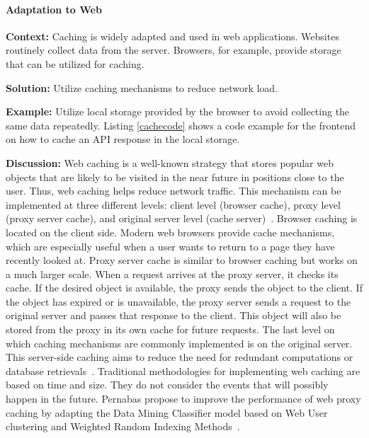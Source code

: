 \paragraph{Adaptation to Web}\mbox{}

\textbf{Context:} Caching is widely adapted and used in web applications. Websites routinely collect data from the server. Browsers, for example, provide storage that can be utilized for caching.

\textbf{Solution:} Utilize caching mechanisms to reduce network load.

\textbf{Example:} Utilize local storage provided by the browser to avoid collecting the same data repeatedly. Listing \ref{cachecode} shows a code example for the frontend on how to cache an API response in the local storage.



\textbf{Discussion:} Web caching is a well-known strategy that stores popular web objects that are likely to be visited in the near future in positions close to the user. Thus, web caching helps reduce network traffic. This mechanism can be implemented at three different levels: client level (browser cache), proxy level (proxy server cache), and original server level (cache server)~\cite{Ali2011}. Browser caching is located on the client side. Modern web browsers provide cache mechanisms, which are especially useful when a user wants to return to a page they have recently looked at. Proxy server cache is similar to browser caching but works on a much larger scale. When a request arrives at the proxy server, it checks its cache. If the desired object is available, the proxy sends the object to the client. If the object has expired or is unavailable, the proxy server sends a request to the original server and passes that response to the client. This object will also be stored from the proxy in its own cache for future requests. The last level on which caching mechanisms are commonly implemented is on the original server. This server-side caching aims to reduce the need for redundant computations or database retrievals~\cite{Ali2011}. Traditional methodologies for implementing web caching are based on time and size. They do not consider the events that will possibly happen in the future. Pernabas \etal propose to improve the performance of web proxy caching by adapting the Data Mining Classifier model based on Web User clustering and Weighted Random Indexing Methods~\cite{Pernabas2019}.


